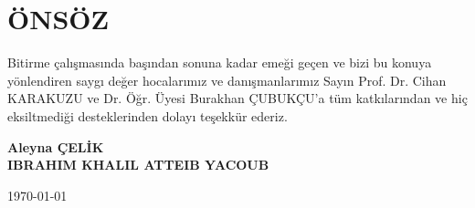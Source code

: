 \section*{ÖNSÖZ}
Bitirme çalışmasında başından sonuna kadar emeği geçen ve bizi bu konuya yönlendiren saygı değer hocalarımız ve danışmanlarımız Sayın Prof. Dr. Cihan KARAKUZU ve Dr. Öğr. Üyesi Burakhan ÇUBUKÇU'a tüm katkılarından ve hiç eksiltmediği desteklerinden dolayı teşekkür ederiz.

\begin{flushright}
\textbf{Aleyna ÇELİK \\ IBRAHIM KHALIL ATTEIB YACOUB}

\today
\end{flushright}